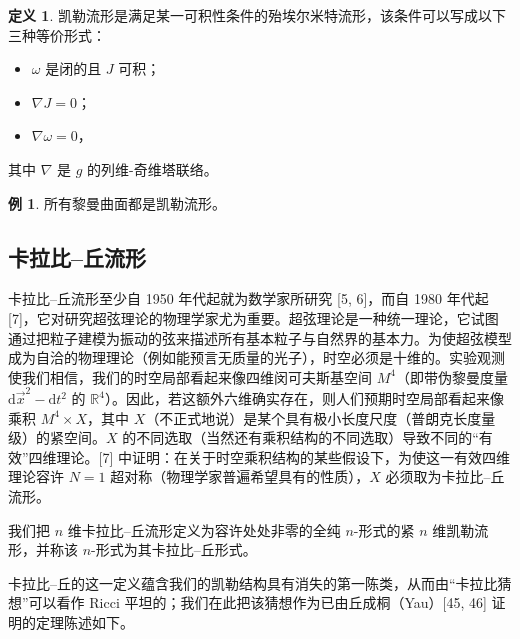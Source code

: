 \documentclass[11pt,a4paper]{article}
\theoremstyle{plain}
\theoremstyle{definition}
\newtheorem{definition}[theorem]{定义}
\newtheorem*{example}{例}
\begin{document}
\begin{definition}
凯勒流形是满足某一可积性条件的殆埃尔米特流形，该条件可以写成以下三种等价形式：
\begin{itemize}
  \item $\omega$ 是闭的且 $J$ 可积；
  \item $\nabla J=0$；
  \item $\nabla\omega=0$，
\end{itemize}
其中 $\nabla$ 是 $g$ 的列维-奇维塔联络。
\end{definition}


\begin{example}
所有黎曼曲面都是凯勒流形。
\end{example}

\subsection{卡拉比–丘流形}

卡拉比–丘流形至少自 1950 年代起就为数学家所研究 [5, 6]，而自 1980 年代起 [7]，它对研究超弦理论的物理学家尤为重要。超弦理论是一种统一理论，它试图通过把粒子建模为振动的弦来描述所有基本粒子与自然界的基本力。为使超弦模型成为自洽的物理理论（例如能预言无质量的光子），时空必须是十维的。实验观测使我们相信，我们的时空局部看起来像四维闵可夫斯基空间 $M^4$（即带伪黎曼度量 $\mathrm{d}\vec{x}^2-\mathrm{d}t^2$ 的 $\mathbb{R}^4$）。因此，若这额外六维确实存在，则人们预期时空局部看起来像乘积 $M^4\times X$，其中 $X$（不正式地说）是某个具有极小长度尺度（普朗克长度量级）的紧空间。$X$ 的不同选取（当然还有乘积结构的不同选取）导致不同的“有效”四维理论。[7] 中证明：在关于时空乘积结构的某些假设下，为使这一有效四维理论容许 $N=1$ 超对称（物理学家普遍希望具有的性质），$X$ 必须取为卡拉比–丘流形。

我们把 $n$ 维卡拉比–丘流形定义为容许处处非零的全纯 $n$-形式的紧 $n$ 维凯勒流形，并称该 $n$-形式为其卡拉比–丘形式。

卡拉比–丘的这一定义蕴含我们的凯勒结构具有消失的第一陈类，从而由“卡拉比猜想”可以看作 Ricci 平坦的；我们在此把该猜想作为已由丘成桐（Yau）[45, 46] 证明的定理陈述如下。
\end{document}
